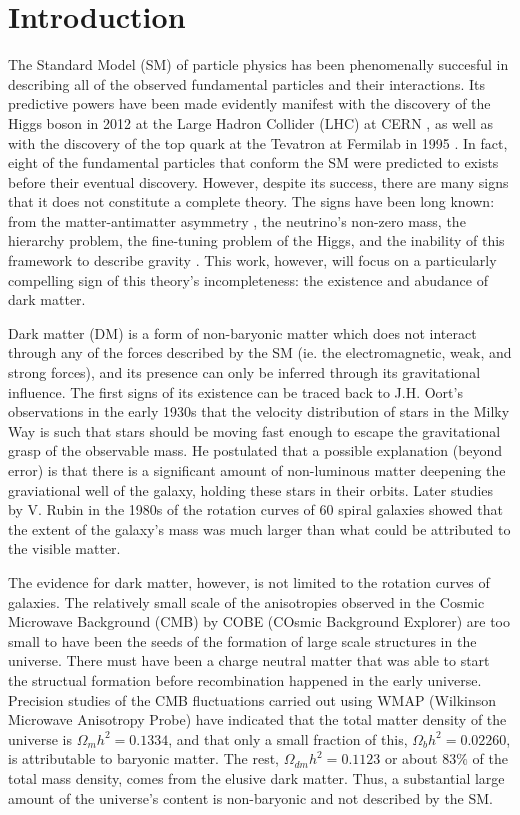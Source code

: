 \chapter{Introduction}

The Standard Model (SM) of particle physics has been phenomenally succesful in describing all of the observed fundamental particles and their interactions. Its predictive powers have been made evidently manifest with the discovery of the Higgs boson in 2012 at the Large Hadron Collider (LHC) at CERN \cite{collaborationObservationNewBoson2012}, as well as with the discovery of the top quark at the Tevatron at Fermilab in 1995 \cite{abachiObservationTopQuark1995}. In fact, eight of the fundamental particles that conform the SM were predicted to exists before their eventual discovery. However, despite its success, there are many signs that it does not constitute a complete theory. The signs have been long known: from the matter-antimatter asymmetry \cite{}, the neutrino's non-zero mass, the hierarchy problem, the fine-tuning problem of the Higgs, and the inability of this framework to describe gravity \cite{}. This work, however, will focus on a particularly compelling sign of this theory's incompleteness: the existence and abudance of dark matter.

Dark matter (DM) is a form of non-baryonic matter which does not interact through any of the forces described by the SM (ie. the electromagnetic, weak, and strong forces), and its presence can only be inferred through its gravitational influence. The first signs of its existence can be traced back to J.H. Oort's observations in the early 1930s that the velocity distribution of stars in the Milky Way is such that stars should be moving fast enough to escape the gravitational grasp of the observable mass. He postulated that a possible explanation (beyond error) is that there is a significant amount of non-luminous matter deepening the graviational well of the galaxy, holding these stars in their orbits. Later studies by V. Rubin in the 1980s of the rotation curves of 60 spiral galaxies showed that the extent of the galaxy's mass was much larger than what could be attributed to the visible matter.

The evidence for dark matter, however, is not limited to the rotation curves of galaxies. The relatively small scale of the anisotropies observed in the Cosmic Microwave Background (CMB) by COBE (COsmic Background Explorer) are too small to have been the seeds of the formation of large scale structures in the universe. There must have been a charge neutral matter that was able to start the structual formation before recombination happened in the early universe. Precision studies of the CMB fluctuations carried out using WMAP (Wilkinson Microwave Anisotropy Probe) have indicated that the total matter density of the universe is $\Omega_{m}h^2 = 0.1334$, and that only a small fraction of this, $\Omega_{b}h^2 = 0.02260$, is attributable to baryonic matter. The rest, $\Omega_{dm}h^2 = 0.1123$ or about $83\%$ of the total mass density, comes from the elusive dark matter. Thus, a substantial large amount of the universe's content is non-baryonic and not described by the SM.

